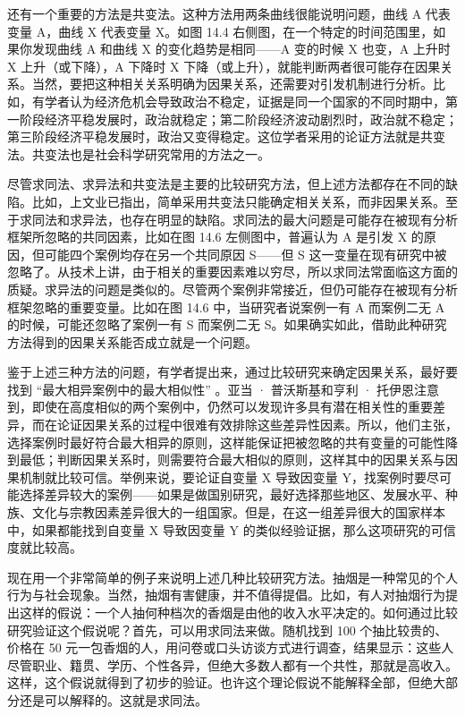 还有一个重要的方法是共变法。这种方法用两条曲线很能说明问题，曲线 A 代表变量 A，曲线 X 代表变量 X。如图 14.4 右侧图，在一个特定的时间范围里，如果你发现曲线 A 和曲线 X 的变化趋势是相同——A 变的时候 X 也变，A 上升时 X 上升（或下降），A 下降时 X 下降（或上升），就能判断两者很可能存在因果关系。当然，要把这种相关关系明确为因果关系，还需要对引发机制进行分析。比如，有学者认为经济危机会导致政治不稳定，证据是同一个国家的不同时期中，第一阶段经济平稳发展时，政治就稳定；第二阶段经济波动剧烈时，政治就不稳定；第三阶段经济平稳发展时，政治又变得稳定。这位学者采用的论证方法就是共变法。共变法也是社会科学研究常用的方法之一。

尽管求同法、求异法和共变法是主要的比较研究方法，但上述方法都存在不同的缺陷。比如，上文业已指出，简单采用共变法只能确定相关关系，而非因果关系。至于求同法和求异法，也存在明显的缺陷。求同法的最大问题是可能存在被现有分析框架所忽略的共同因素，比如在图 14.6 左侧图中，普遍认为 A 是引发 X 的原因，但可能四个案例均存在另一个共同原因 S——但 S 这一变量在现有研究中被忽略了。从技术上讲，由于相关的重要因素难以穷尽，所以求同法常面临这方面的质疑。求异法的问题是类似的。尽管两个案例非常接近，但仍可能存在被现有分析框架忽略的重要变量。比如在图 14.6 中，当研究者说案例一有 A 而案例二无 A 的时候，可能还忽略了案例一有 S 而案例二无 S。如果确实如此，借助此种研究方法得到的因果关系能否成立就是一个问题。

鉴于上述三种方法的问题，有学者提出来，通过比较研究来确定因果关系，最好要找到 “最大相异案例中的最大相似性” 。亚当 · 普沃斯基和亨利 · 托伊恩注意到，即使在高度相似的两个案例中，仍然可以发现许多具有潜在相关性的重要差异，而在论证因果关系的过程中很难有效排除这些差异性因素。所以，他们主张，选择案例时最好符合最大相异的原则，这样能保证把被忽略的共有变量的可能性降到最低；判断因果关系时，则需要符合最大相似的原则，这样其中的因果关系与因果机制就比较可信。举例来说，要论证自变量 X 导致因变量 Y，找案例时要尽可能选择差异较大的案例——如果是做国别研究，最好选择那些地区、发展水平、种族、文化与宗教因素差异很大的一组国家。但是，在这一组差异很大的国家样本中，如果都能找到自变量 X 导致因变量 Y 的类似经验证据，那么这项研究的可信度就比较高。

现在用一个非常简单的例子来说明上述几种比较研究方法。抽烟是一种常见的个人行为与社会现象。当然，抽烟有害健康，并不值得提倡。比如，有人对抽烟行为提出这样的假说：一个人抽何种档次的香烟是由他的收入水平决定的。如何通过比较研究验证这个假说呢？首先，可以用求同法来做。随机找到 100 个抽比较贵的、价格在 50 元一包香烟的人，用问卷或口头访谈方式进行调查，结果显示：这些人尽管职业、籍贯、学历、个性各异，但绝大多数人都有一个共性，那就是高收入。这样，这个假说就得到了初步的验证。也许这个理论假说不能解释全部，但绝大部分还是可以解释的。这就是求同法。

